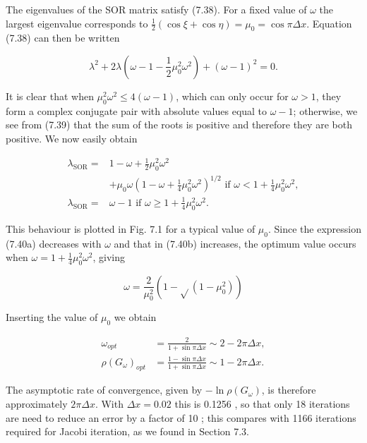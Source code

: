 \documentclass[10pt]{article}
\begin{document}
The eigenvalues of the SOR matrix satisfy (7.38). For a fixed value of \(\omega\) the largest eigenvalue corresponds to \(\frac{1}{2}(\cos \xi+\cos \eta)=\mu_{0}=\cos \pi \Delta x\). Equation (7.38) can then be written

\[
\lambda^{2}+2 \lambda\left(\omega-1-\frac{1}{2} \mu_{0}^{2} \omega^{2}\right)+(\omega-1)^{2}=0 .
\]

It is clear that when \(\mu_{0}^{2} \omega^{2} \leq 4(\omega-1)\), which can only occur for \(\omega>1\), they form a complex conjugate pair with absolute values equal to \(\omega-1\); otherwise, we see from (7.39) that the sum of the roots is positive and therefore they are both positive. We now easily obtain

\[
\begin{aligned}
\lambda_{\mathrm{SOR}}= & 1-\omega+\frac{1}{2} \mu_{0}^{2} \omega^{2} \\
& +\mu_{0} \omega\left(1-\omega+\frac{1}{4} \mu_{0}^{2} \omega^{2}\right)^{1 / 2} \text { if } \omega<1+\frac{1}{4} \mu_{0}^{2} \omega^{2}, \\
\lambda_{\mathrm{SOR}}= & \omega-1 \text { if } \omega \geq 1+\frac{1}{4} \mu_{0}^{2} \omega^{2} .
\end{aligned}
\]

This behaviour is plotted in Fig. 7.1 for a typical value of \(\mu_{0}\). Since the expression (7.40a) decreases with \(\omega\) and that in (7.40b) increases, the optimum value occurs when \(\omega=1+\frac{1}{4} \mu_{0}^{2} \omega^{2}\), giving

\[
\omega=\frac{2}{\mu_{0}^{2}}\left(1-\sqrt{ }\left(1-\mu_{0}^{2}\right)\right)
\]

Inserting the value of \(\mu_{0}\) we obtain

\[
\begin{aligned}
\omega_{o p t} & =\frac{2}{1+\sin \pi \Delta x} \sim 2-2 \pi \Delta x, \\
\rho\left(G_{\omega}\right)_{o p t} & =\frac{1-\sin \pi \Delta x}{1+\sin \pi \Delta x} \sim 1-2 \pi \Delta x .
\end{aligned}
\]

The asymptotic rate of convergence, given by \(-\ln \rho\left(G_{\omega}\right)\), is therefore approximately \(2 \pi \Delta x\). With \(\Delta x=0.02\) this is 0.1256 , so that only 18 iterations are need to reduce an error by a factor of 10 ; this compares with 1166 iterations required for Jacobi iteration, as we found in Section 7.3.
\end{document}
